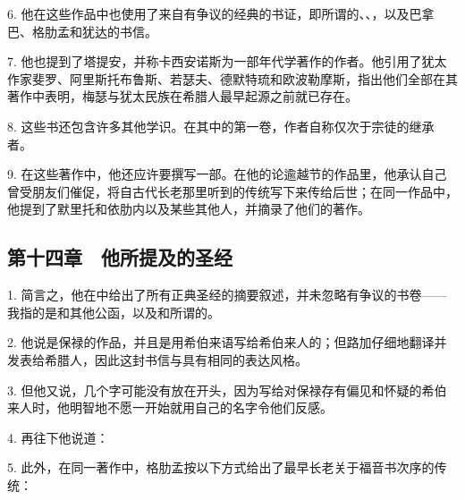 6. 他在这些作品中也使用了来自有争议的经典的书证，即所谓的、、，以及巴拿巴、格肋孟和犹达的书信。\par

7. 他也提到了塔提安，并称卡西安诺斯为一部年代学著作的作者。他引用了犹太作家斐罗、阿里斯托布鲁斯、若瑟夫、德默特琉和欧波勒摩斯，指出他们全部在其著作中表明，梅瑟与犹太民族在希腊人最早起源之前就已存在。\par

8. 这些书还包含许多其他学识。在其中的第一卷，作者自称仅次于宗徒的继承者。\par

9. 在这些著作中，他还应许要撰写一部。在他的论逾越节的作品里，他承认自己曾受朋友们催促，将自古代长老那里听到的传统写下来传给后世；在同一作品中，他提到了默里托和依肋内以及某些其他人，并摘录了他们的著作。\par


\subsection{第十四章　他所提及的圣经}

1. 简言之，他在中给出了所有正典圣经的摘要叙述，并未忽略有争议的书卷——我指的是和其他公函，以及和所谓的。\par

2. 他说是保禄的作品，并且是用希伯来语写给希伯来人的；但路加仔细地翻译并发表给希腊人，因此这封书信与具有相同的表达风格。\par

3. 但他又说，几个字可能没有放在开头，因为写给对保禄存有偏见和怀疑的希伯来人时，他明智地不愿一开始就用自己的名字令他们反感。\par

4. 再往下他说道：\par

5. 此外，在同一著作中，格肋孟按以下方式给出了最早长老关于福音书次序的传统：\par

